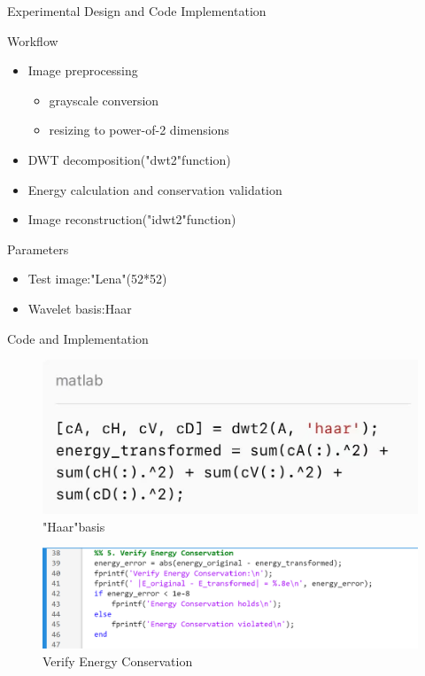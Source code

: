 \documentclass{beamer}
\begin{document}
\begin{frame}{Experimental Design and Code Implementation}
    \begin{block}{Workflow}
        \begin{itemize}
            \item Image preprocessing
                  \begin{itemize}
                      \item grayscale conversion
                      \item resizing to power-of-2 dimensions
                  \end{itemize}
            \item DWT decomposition("dwt2"function)
            \item Energy calculation and conservation validation
            \item Image reconstruction("idwt2"function)
        \end{itemize}
    \end{block}
    \begin{block}{Parameters}
        \begin{itemize}
            \item Test image:"Lena"(52*52)
            \item Wavelet basis:Haar
        \end{itemize}
    \end{block}

\end{frame}

\begin{frame}{Code and Implementation}
    \begin{figure}
        \centering
        \includegraphics[width=0.5\linewidth]{fig/代码2.jpg}
        \caption{"Haar"basis}
    \end{figure}
    \begin{figure}
        \centering
        \includegraphics[width=1\linewidth]{fig/代码3.png}
        \caption{Verify Energy Conservation}
    \end{figure}
\end{frame}
\end{document}
